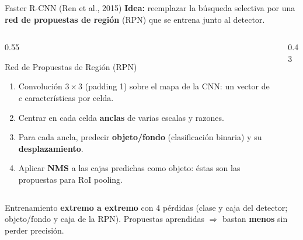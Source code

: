 \documentclass[aspectratio=169, 10pt]{beamer}
\begin{document}
\begin{frame}{Faster R-CNN (Ren et al., 2015)}
	\textbf{Idea:} reemplazar la búsqueda selectiva por una \textbf{red de propuestas de región} (RPN) que se entrena junto al detector.
	\vspace{-0.2cm}
	\begin{columns}[T]
		\begin{column}{0.55\textwidth}
			\begin{block}{Red de Propuestas de Región (RPN)}
				\begin{enumerate}
					\item Convolución $3\times3$ (padding 1) sobre el mapa de la CNN: un vector de $c$ características por celda.
					\item Centrar en cada celda \textbf{anclas} de varias escalas y razones.
					\item Para cada ancla, predecir \textbf{objeto/fondo} (clasificación binaria) y su \textbf{desplazamiento}.
					\item Aplicar \textbf{NMS} a las cajas predichas como objeto: éstas son las propuestas para RoI pooling.
				\end{enumerate}
			\end{block}
		\end{column}
		\begin{column}{0.43\textwidth}
			\begin{center}
			\end{center}
		\end{column}
	\end{columns}
	\vspace{0.1cm}
	\small Entrenamiento \textbf{extremo a extremo} con 4 pérdidas (clase y caja del detector; objeto/fondo y caja de la RPN). Propuestas aprendidas $\Rightarrow$ bastan \textbf{menos} sin perder precisión.
\end{frame}
\end{document}
